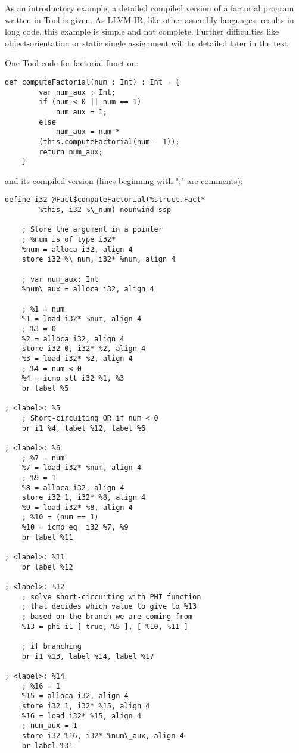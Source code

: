 As an introductory example, a detailed compiled version of a factorial program written in Tool is given. As LLVM-IR, like other assembly languages, results in long code, this example is simple and not complete. Further difficulties like object-orientation or static single assignment will be detailed later in the text.

One Tool code for factorial function:
\begin{lstlisting}
def computeFactorial(num : Int) : Int = {
        var num_aux : Int;
        if (num < 0 || num == 1)
            num_aux = 1;
        else
            num_aux = num * 
		(this.computeFactorial(num - 1));
        return num_aux;
    }
\end{lstlisting}
and its compiled version (lines beginning with ";" are comments):
\begin{verbatim}
define i32 @Fact$computeFactorial(%struct.Fact* 
        %this, i32 %\_num) nounwind ssp
    
    ; Store the argument in a pointer
    ; %num is of type i32*
    %num = alloca i32, align 4
    store i32 %\_num, i32* %num, align 4

    ; var num_aux: Int
    %num\_aux = alloca i32, align 4

    ; %1 = num
    %1 = load i32* %num, align 4
    ; %3 = 0
    %2 = alloca i32, align 4
    store i32 0, i32* %2, align 4
    %3 = load i32* %2, align 4
    ; %4 = num < 0
    %4 = icmp slt i32 %1, %3
    br label %5
    
; <label>: %5
    ; Short-circuiting OR if num < 0
    br i1 %4, label %12, label %6
    
; <label>: %6
    ; %7 = num
    %7 = load i32* %num, align 4
    ; %9 = 1
    %8 = alloca i32, align 4
    store i32 1, i32* %8, align 4
    %9 = load i32* %8, align 4
    ; %10 = (num == 1)
    %10 = icmp eq  i32 %7, %9
    br label %11
    
; <label>: %11
    br label %12
    
; <label>: %12
    ; solve short-circuiting with PHI function
    ; that decides which value to give to %13
    ; based on the branch we are coming from
    %13 = phi i1 [ true, %5 ], [ %10, %11 ]

    ; if branching
    br i1 %13, label %14, label %17
    
; <label>: %14
    ; %16 = 1
    %15 = alloca i32, align 4
    store i32 1, i32* %15, align 4
    %16 = load i32* %15, align 4
    ; num_aux = 1
    store i32 %16, i32* %num\_aux, align 4
    br label %31
    

\end{verbatim}
